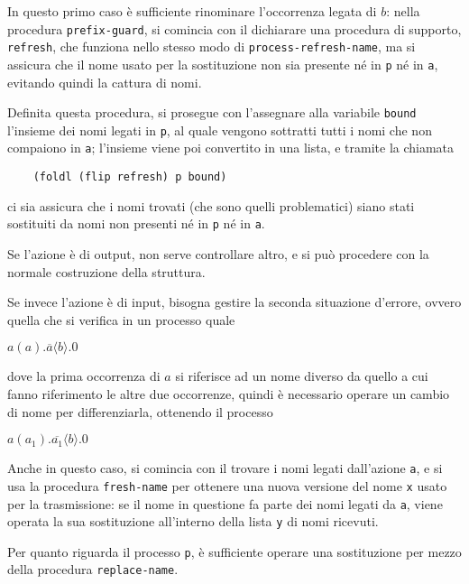 In questo primo caso \`e sufficiente rinominare l'occorrenza legata di $b$:
nella procedura \lstinline{prefix-guard}, si comincia con il dichiarare una
procedura di supporto, \lstinline{refresh}, che funziona nello stesso modo
di \lstinline{process-refresh-name}, ma si assicura che il nome usato per
la sostituzione non sia presente n\'e in \lstinline{p} n\'e in
\lstinline{a}, evitando quindi la cattura di nomi.

Definita questa procedura, si prosegue con l'assegnare alla variabile
\lstinline{bound} l'insieme dei nomi legati in \lstinline{p}, al quale
vengono sottratti tutti i nomi che non compaiono in \lstinline{a};
l'insieme viene poi convertito in una lista, e tramite la chiamata

\begin{lstlisting}
    (foldl (flip refresh) p bound)
\end{lstlisting}

ci sia assicura che i nomi trovati (che sono quelli problematici) siano
stati sostituiti da nomi non presenti n\'e in \lstinline{p} n\'e in
\lstinline{a}.

Se l'azione \`e di output, non serve controllare altro, e si pu\`o
procedere con la normale costruzione della struttura.

Se invece l'azione \`e di input, bisogna gestire la seconda situazione
d'errore, ovvero quella che si verifica in un processo quale

\begin{pilisting}
$
    a(a).\overline{a}\langle b\rangle.0
$
\end{pilisting}

dove la prima occorrenza di $a$ si riferisce ad un nome diverso da
quello a cui fanno riferimento le altre due occorrenze, quindi \`e
necessario operare un cambio di nome per differenziarla, ottenendo il
processo

\begin{pilisting}
$
    a(a_1).\overline{a_1}\langle b\rangle.0
$
\end{pilisting}

Anche in questo caso, si comincia con il trovare i nomi legati dall'azione
\lstinline{a}, e si usa la procedura \lstinline{fresh-name} per ottenere
una nuova versione del nome \lstinline{x} usato per la trasmissione: se il
nome in questione fa parte dei nomi legati da \lstinline{a}, viene
operata la sua sostituzione all'interno della lista \lstinline{y} di nomi
ricevuti.

Per quanto riguarda il processo \lstinline{p}, \`e sufficiente operare una
sostituzione per mezzo della procedura \lstinline{replace-name}.


